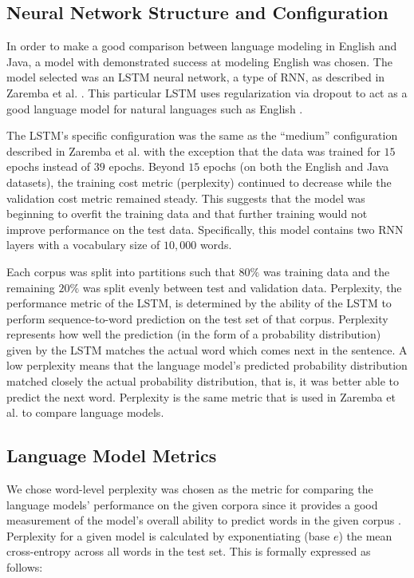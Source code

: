 \documentclass[runningheads,a4paper]{llncs}
\begin{document}
\subsection{Neural Network Structure and Configuration}

In order to make a good comparison between language modeling in English
and Java, a model with demonstrated success at modeling English was
chosen. The model selected was an LSTM neural
network, a type of RNN, as described in
Zaremba et al. \cite{Zaremba}. This particular LSTM uses regularization via 
dropout to act as a good language model for natural languages
such as English \cite{Zaremba}.

The LSTM's specific configuration was the same as the ``medium''
configuration described in Zaremba et al. \cite{Zaremba} with the exception
that the data was trained for $15$ epochs instead of $39$ epochs.
Beyond $15$ epochs (on both the English and Java datasets), the 
training cost metric (perplexity) continued to decrease while the
validation cost metric remained steady. This suggests that the model
was beginning to overfit the training data and that further training
would not improve performance on the test data.
Specifically, this model contains two RNN layers with a vocabulary
size of $10,000$ words.

Each corpus was split into partitions such that $80\%$ was training data
and the remaining $20\%$ was split evenly between test and validation
data. Perplexity, the performance metric of the LSTM, is determined by the
ability of the LSTM to perform sequence-to-word prediction on the test
set of that corpus. Perplexity represents how well the prediction (in the
form of a probability distribution) given by the LSTM matches the actual
word which comes next in the sentence. A low perplexity means that the
language model's predicted probability distribution matched closely the
actual probability distribution, that is, it was better able to predict
the next word. Perplexity is the same metric that is used in
Zaremba et al. \cite{Zaremba} to compare language models.

\subsection{Language Model Metrics}

We chose word-level perplexity was chosen as the metric for comparing the
language models' performance on the given corpora since it provides
a good measurement of the model's overall ability to predict words
in the given corpus \cite{sundermeyer2015feedforward}. 
Perplexity for a given model is calculated
by exponentiating (base $e$) the mean
cross-entropy across all words in the test set. This is formally
expressed as follows:
\end{document}
